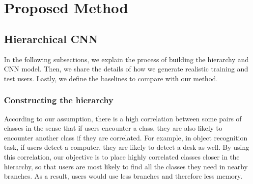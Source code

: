 
\lhead[\chaptername~\thechapter]{\rightmark}

\rhead[\leftmark]{}

\lfoot[\thepage]{}

\cfoot{}

\rfoot[]{\thepage}

\chapter{Proposed Method}
\label{method}


\section{Hierarchical CNN}
\label{sec:HierCNN}

In the following subsections, we explain the process of building the hierarchy and CNN model. 
Then, we share the details of how we generate realistic training and test users.
Lastly, we define the baselines to compare with our method.

\subsection{Constructing the hierarchy}
\label{ssec:hierarchy}

According to our assumption, there is a high correlation between some pairs of classes in the sense that 
if users encounter a class, they are also likely to encounter another class if they are correlated. 
For example, in object recognition task, if users detect a computer, they are likely to detect a desk as well. 
By using this correlation, our objective is to place highly correlated classes closer in the hierarchy, 
so that users are most likely to find all the classes they need in nearby branches. 
As a result, users would use less branches and therefore less memory.

